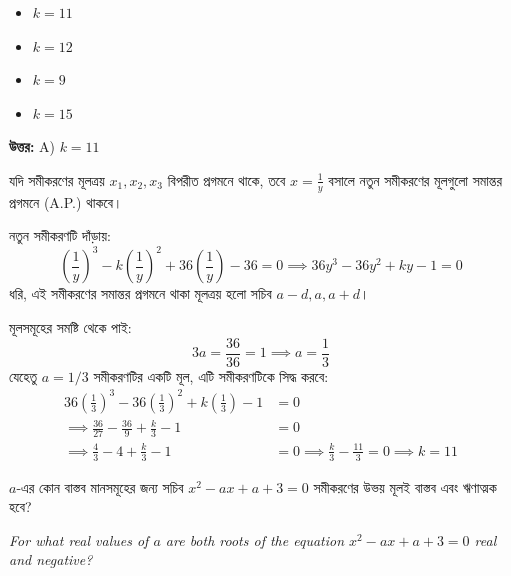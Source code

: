 \documentclass[12pt, a4paper]{article}
\begin{document}
\begin{itemize}[label={}, leftmargin=1cm, itemsep=0.5em]
    \item[\textbf{A)}] $k = 11$
    \item[\textbf{B)}] $k = 12$
    \item[\textbf{C)}] $k = 9$
    \item[\textbf{D)}] $k = 15$
\end{itemize}

\vspace{0.5em}
\begin{tcolorbox}[answerbox]
    \textbf{\color{success} উত্তর:} A) $k = 11$
\end{tcolorbox}
\vspace{1em}

\begin{tcolorbox}[solutionbox={সমাধান (Solution)}]
    \noindent
    যদি সমীকরণের মূলত্রয় $x_1, x_2, x_3$ বিপরীত প্রগমনে থাকে, তবে $x = \frac{1}{y}$ বসালে নতুন সমীকরণের মূলগুলো সমান্তর প্রগমনে (A.P.) থাকবে। 
    
    নতুন সমীকরণটি দাঁড়ায়:
    \[ \left(\frac{1}{y}\right)^3 - k\left(\frac{1}{y}\right)^2 + 36\left(\frac{1}{y}\right) - 36 = 0 \implies 36y^3 - 36y^2 + ky - 1 = 0 \]
    ধরি, এই সমীকরণের সমান্তর প্রগমনে থাকা মূলত্রয় হলো সচিব $a-d, a, a+d$। 
    
    মূলসমূহের সমষ্টি থেকে পাই:
    \[ 3a = \frac{36}{36} = 1 \implies a = \frac{1}{3} \]
    যেহেতু $a = 1/3$ সমীকরণটির একটি মূল, এটি সমীকরণটিকে সিদ্ধ করবে:
    \begin{align*}
        36\left(\frac{1}{3}\right)^3 - 36\left(\frac{1}{3}\right)^2 + k\left(\frac{1}{3}\right) - 1 &= 0 \\
        \implies \frac{36}{27} - \frac{36}{9} + \frac{k}{3} - 1 &= 0 \\
        \implies \frac{4}{3} - 4 + \frac{k}{3} - 1 &= 0 \implies \frac{k}{3} - \frac{11}{3} = 0 \implies k = 11
    \end{align*}
\end{tcolorbox}

\vspace{1em}

\begin{tcolorbox}[questionbox={প্রশ্ন (Question) 42}]
    \noindent
    $a$-এর কোন বাস্তব মানসমূহের জন্য সচিব $x^2 - ax + a + 3 = 0$ সমীকরণের উভয় মূলই বাস্তব এবং ঋণাত্মক হবে?
    
    \vspace{0.8em}
    \begin{english}
    \noindent\textit{\color{darkgray}
    For what real values of $a$ are both roots of the equation $x^2 - ax + a + 3 = 0$ real and negative?
    }
    \end{english}
\end{tcolorbox}
\end{document}
